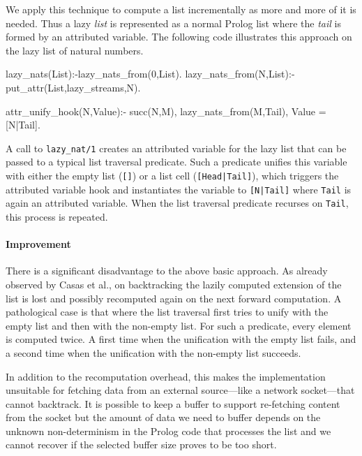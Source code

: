 \documentclass{new_tlp}
\begin{document}
We apply this technique to compute a list incrementally as more
and more of it is needed. Thus a lazy \emph{list} is represented as a normal
Prolog list where the \emph{tail} is formed by an attributed variable. The following
code illustrates this approach on the lazy list of natural numbers.
\begin{code}
lazy_nats(List):-lazy_nats_from(0,List). 
lazy_nats_from(N,List):-put_attr(List,lazy_streams,N).

attr_unify_hook(N,Value):-
  succ(N,M),
  lazy_nats_from(M,Tail),
  Value = [N|Tail].
\end{code}
A call to \texttt{lazy\_nat/1} creates an attributed variable for the lazy list
that can be passed to a typical list traversal predicate.  Such a predicate
unifies this variable with either the empty list (\texttt{[]}) or a list cell
(\texttt{[Head|Tail]}), which triggers the attributed variable hook and
instantiates the variable to {\tt [N|Tail]} where {\tt Tail} is again an
attributed variable. When the list traversal predicate recurses on {\tt Tail},
this process is repeated.

\paragraph{Improvement}
There is a significant disadvantage to the above basic approach.  As already
observed by Casas et al., on backtracking the lazily computed extension of the
list is lost and possibly recomputed again on the next forward computation. A
pathological case is that where the list traversal first tries to unify with
the empty list and then with the non-empty list. For such a predicate, every
element is computed twice. A first time when the unification with the empty
list fails, and a second time when the unification with the non-empty list
succeeds.

In addition to the recomputation overhead, this makes the implementation
unsuitable for fetching data from an external source---like a network socket---that cannot backtrack. It is possible to keep a
buffer to support re-fetching content from the socket but the amount of data we
need to buffer depends on the unknown non-determinism in the Prolog code that
processes the list and we cannot recover if the selected buffer size proves to
be too short.
\end{document}
